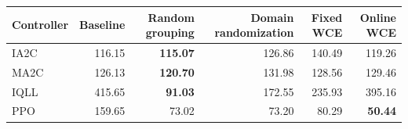 \begin{tabular}{lrrrrr}
\hline
Controller & Baseline & Random grouping & Domain randomization & Fixed WCE & Online WCE \\
\hline
IA2C & 116.15 & \textbf{115.07} & 126.86 & 140.49 & 119.26 \\
MA2C & 126.13 & \textbf{120.70} & 131.98 & 128.56 & 129.46 \\
IQLL & 415.65 & \textbf{91.03} & 172.55 & 235.93 & 395.16 \\
PPO & 159.65 & 73.02 & 73.20 & 80.29 & \textbf{50.44} \\
\hline
\end{tabular}
